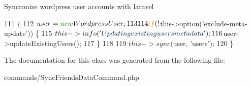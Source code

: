 Syncronize wordpress user accounts with laravel 
\begin{DoxyCode}
111     \{
112         $user = \textcolor{keyword}{new} WordpressUser;
113 
114         \textcolor{keywordflow}{if} (!$this->option(\textcolor{stringliteral}{'exclude-meta-update'})) \{
115             $this->info(\textcolor{stringliteral}{'Updating existing users metadata'});
116             $user->updateExistingUsers();
117         \}
118 
119         $this->sync($user, \textcolor{stringliteral}{'users'});
120     \}
\end{DoxyCode}


The documentation for this class was generated from the following file\+:\begin{DoxyCompactItemize}
\item 
commands/Sync\+Friends\+Data\+Command.\+php\end{DoxyCompactItemize}
